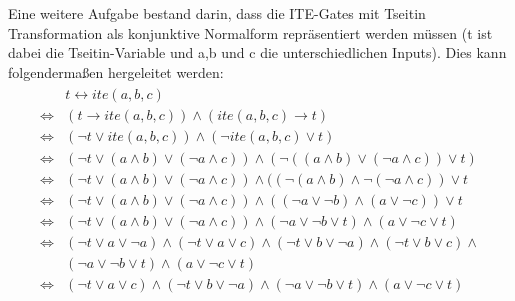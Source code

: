 \documentclass[a4,abstract=on]{scrartcl}
\begin{document}
Eine weitere Aufgabe bestand darin, dass die ITE-Gates mit Tseitin Transformation als konjunktive Normalform repräsentiert werden müssen (t ist dabei die Tseitin-Variable und a,b und c die unterschiedlichen Inputs). Dies kann folgendermaßen hergeleitet werden:\\
\begin{align*}
\begin{aligned}
&t \leftrightarrow ite(a,b,c)\\
\Leftrightarrow& (t \rightarrow ite (a,b,c)) \wedge (ite (a,b,c) \rightarrow t)\\
\Leftrightarrow& (\neg t \vee ite(a,b,c)) \wedge (\neg ite(a,b,c) \vee t)\\
\Leftrightarrow& (\neg t \vee (a \wedge b) \vee (\neg a \wedge c)) \wedge (\neg((a \wedge b) \vee (\neg a \wedge c)) \vee t)\\
\Leftrightarrow& (\neg t \vee (a \wedge b) \vee (\neg a \wedge c)) \wedge ((\neg(a \wedge b) \wedge \neg (\neg a \wedge c)) \vee t\\
\Leftrightarrow& (\neg t \vee (a \wedge b) \vee (\neg a \wedge c)) \wedge ((\neg a \vee \neg b) \wedge (a \vee \neg c)) \vee t\\
\Leftrightarrow& (\neg t \vee (a \wedge b) \vee (\neg a \wedge c)) \wedge (\neg a \vee \neg b \vee t) \wedge (a \vee \neg c \vee t)\\
\Leftrightarrow& (\neg t \vee a \vee \neg a) \wedge (\neg t \vee a\vee c) \wedge (\neg t \vee b \vee \neg a) \wedge (\neg t \vee b \vee c) \wedge \\
& (\neg a \vee \neg b \vee t) \wedge (a \vee \neg c \vee t)\\
\Leftrightarrow &(\neg t \vee a\vee c) \wedge (\neg t \vee b \vee \neg a) \wedge (\neg a \vee \neg b \vee t) \wedge (a \vee \neg c \vee t)
\end{aligned}
\end{align*}

\end{document}
